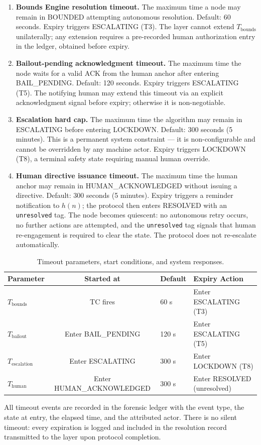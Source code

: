\begin{enumerate}
\item[\textbf{$T_{\text{bounds}}$}] \textbf{Bounds Engine resolution timeout.} The maximum time a node may remain in BOUNDED attempting autonomous resolution. Default: 60 seconds. Expiry triggers ESCALATING (T3). The \fact{} layer cannot extend $T_{\text{bounds}}$ unilaterally; any extension requires a pre-recorded human authorization entry in the ledger, obtained before expiry.

\item[\textbf{$T_{\text{bailout}}$}] \textbf{Bailout-pending acknowledgment timeout.} The maximum time the node waits for a valid ACK from the human anchor after entering BAIL\_PENDING. Default: 120 seconds. Expiry triggers ESCALATING (T5). The notifying human may extend this timeout via an explicit acknowledgment signal before expiry; otherwise it is non-negotiable.

\item[\textbf{$T_{\text{escalation}}$}] \textbf{Escalation hard cap.} The maximum time the algorithm may remain in ESCALATING before entering LOCKDOWN. Default: 300 seconds (5 minutes). This is a permanent system constraint — it is non-configurable and cannot be overridden by any machine actor. Expiry triggers LOCKDOWN (T8), a terminal safety state requiring manual human override.

\item[\textbf{$T_{\text{human}}$}] \textbf{Human directive issuance timeout.} The maximum time the human anchor may remain in HUMAN\_ACKNOWLEDGED without issuing a directive. Default: 300 seconds (5 minutes). Expiry triggers a reminder notification to $h(n)$; the protocol then enters RESOLVED with an \texttt{unresolved} tag. The node becomes quiescent: no autonomous retry occurs, no further actions are attempted, and the \texttt{unresolved} tag signals that human re-engagement is required to clear the state. The protocol does not re-escalate automatically.
\end{enumerate}

\begin{table}[htbp]
\centering
\caption{Timeout parameters, start conditions, and system responses.}
\label{tab:timeouts}
\begin{tabular}{lcll}
\toprule
\textbf{Parameter} & \textbf{Started at} & \textbf{Default} & \textbf{Expiry Action} \\ \midrule
$T_{\text{bounds}}$ & TC fires & 60 s & Enter ESCALATING (T3) \\
$T_{\text{bailout}}$ & Enter BAIL\_PENDING & 120 s & Enter ESCALATING (T5) \\
$T_{\text{escalation}}$ & Enter ESCALATING & 300 s & Enter LOCKDOWN (T8) \\
$T_{\text{human}}$ & Enter HUMAN\_ACKNOWLEDGED & 300 s & Enter RESOLVED (unresolved) \\ \bottomrule
\end{tabular}
\end{table}

All timeout events are recorded in the forensic ledger with the event type, the state at entry, the elapsed time, and the attributed actor. There is no silent timeout: every expiration is logged and included in the resolution record transmitted to the \purpose{} layer upon protocol completion.